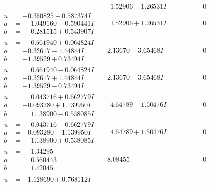 \documentclass[1p]{elsarticle_modified}
\theoremstyle{definition}
\begin{document}
$$\begin{array}{c|c|c}
 & \phantom{-}1.52906 - 1.26531 I & \phantom{-0.000000 } 0 \\ \hline\begin{aligned}
u &= -0.350825 - 0.587374 I \\
a &= \phantom{-}1.049160 - 0.590441 I \\
b &= \phantom{-}0.281515 + 0.543907 I\end{aligned}
 & \phantom{-}1.52906 + 1.26531 I & \phantom{-0.000000 } 0 \\ \hline\begin{aligned}
u &= \phantom{-}0.661940 + 0.064824 I \\
a &= -0.32617 - 1.44844 I \\
b &= -1.39529 + 0.73494 I\end{aligned}
 & -2.13670 + 3.65468 I & \phantom{-0.000000 } 0 \\ \hline\begin{aligned}
u &= \phantom{-}0.661940 - 0.064824 I \\
a &= -0.32617 + 1.44844 I \\
b &= -1.39529 - 0.73494 I\end{aligned}
 & -2.13670 - 3.65468 I & \phantom{-0.000000 } 0 \\ \hline\begin{aligned}
u &= \phantom{-}0.043716 + 0.662779 I \\
a &= -0.093280 + 1.139950 I \\
b &= \phantom{-}1.138900 - 0.538085 I\end{aligned}
 & \phantom{-}4.64789 - 1.50476 I & \phantom{-0.000000 } 0 \\ \hline\begin{aligned}
u &= \phantom{-}0.043716 - 0.662779 I \\
a &= -0.093280 - 1.139950 I \\
b &= \phantom{-}1.138900 + 0.538085 I\end{aligned}
 & \phantom{-}4.64789 + 1.50476 I & \phantom{-0.000000 } 0 \\ \hline\begin{aligned}
u &= \phantom{-}1.34295\phantom{ +0.000000I} \\
a &= \phantom{-}0.560443\phantom{ +0.000000I} \\
b &= \phantom{-}1.42045\phantom{ +0.000000I}\end{aligned}
 & -8.08455\phantom{ +0.000000I} & \phantom{-0.000000 } 0 \\ \hline\begin{aligned}
u &= -1.128690 + 0.768112 I \\

\end{aligned}
\end{array}$$
\end{document}
